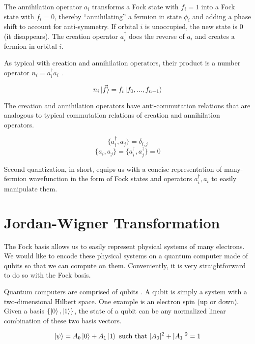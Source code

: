 The annihilation operator $a_i$ transforms a Fock state with $f_i = 1$ into a Fock state with $f_i = 0$, thereby ``annihilating'' a fermion in state $\phi_i$ and adding a phase shift to account for anti-symmetry. If orbital $i$ is unoccupied, the new state is $0$ (it disappears). The creation operator $a^\dag_i$ does the reverse of $a_i$ and creates a fermion in orbital $i$.

As typical with creation and annihilation operators, their product is a number operator $n_i = a^\dag_ia_i$ \cite{QCC}.

\begin{equation}
    n_i\ket{\vec{f}} = f_i\ket{f_0, ..., f_{n - 1}}
\end{equation}

The creation and annihilation operators have anti-commutation relations \cite{QCC} that are analogous to typical commutation relations of creation and annihilation operators.

\begin{equation}
    \{a^\dag_i, a_j\} = \delta_{i, j}
\end{equation}
\begin{equation}
    \{a_i, a_j\} = \{a^\dag_i, a^\dag_j\} = 0
\end{equation}

Second quantization, in short, equips us with a concise representation of many-fermion wavefunction in the form of Fock states and operators $a^\dag_i, a_i$ to easily manipulate them.

\section{Jordan-Wigner Transformation}

The Fock basis allows us to easily represent physical systems of many electrons. We would like to encode these physical systems on a quantum computer made of qubits so that we can compute on them. Conveniently, it is very straightforward to do so with the Fock basis.

Quantum computers are comprised of qubits \cite{MikeIke}. A qubit is simply a system with a two-dimensional Hilbert space. One example is an electron spin (up or down). Given a basis $\{\ket{0}, \ket{1}\}$, the state of a qubit can be any normalized linear combination of these two basis vectors.

\begin{equation}
    \ket{\psi} = A_0\ket{0} + A_1\ket{1} \text{ such that } |A_0|^2 + |A_1|^2 = 1
\end{equation}

